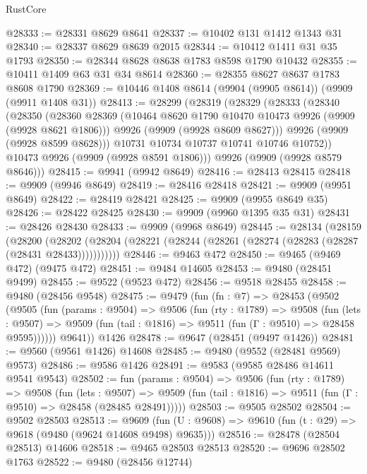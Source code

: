 \begin{lexlean}{RustCore}
\begin{coremodule}
@28333 := @28331 @8629 @8641
@28337 := @10402 @131 @1412 @1343 @31
@28340 := @28337 @8629 @8639 @2015
@28344 := @10412 @1411 @31 @35 @1793
@28350 := @28344 @8628 @8638 @1783 @8598 @1790 @10432
@28355 := @10411 @1409 @63 @31 @34 @8614
@28360 := @28355 @8627 @8637 @1783 @8608 @1790
@28369 := @10446 @1408 @8614 (@9904 (@9905 @8614)) (@9909 (@9911 @1408 @31))
@28413 := @28299
    (@28319
      (@28329
        (@28333
          (@28340
            (@28350
              (@28360
                @28369
                (@10464 @8620 @1790 @10470 @10473 @9926 (@9909 (@9928 @8621 @1806)))
                @9926
                (@9909 (@9928 @8609 @8627)))
              @9926
              (@9909 (@9928 @8599 @8628)))
            @10731
            @10734
            @10737
            @10741
            @10746
            @10752))
        @10473
        @9926
        (@9909 (@9928 @8591 @1806)))
      @9926
      (@9909 (@9928 @8579 @8646)))
@28415 := @9941 (@9942 @8649)
@28416 := @28413 @28415
@28418 := @9909 (@9946 @8649)
@28419 := @28416 @28418
@28421 := @9909 (@9951 @8649)
@28422 := @28419 @28421
@28425 := @9909 (@9955 @8649 @35)
@28426 := @28422 @28425
@28430 := @9909 (@9960 @1395 @35 @31)
@28431 := @28426 @28430
@28433 := @9909 (@9968 @8649)
@28445 := @28134
    (@28159
      (@28200
        (@28202 (@28204 (@28221 (@28244 (@28261 (@28274 (@28283 (@28287 (@28431 @28433)))))))))))
@28446 := @9463 @472
@28450 := @9465 (@9469 @472) (@9475 @472)
@28451 := @9484 @14605
@28453 := @9480 (@28451 @9499)
@28455 := @9522 (@9523 @472)
@28456 := @9518 @28455
@28458 := @9480 (@28456 @9548)
@28475 := @9479
    (fun (fn : @7) =>
    @28453
      (@9502
        (@9505
          (fun (params : @9504) =>
          @9506
            (fun (rty : @1789) =>
            @9508
              (fun (lets : @9507) =>
              @9509 (fun (tail : @1816) => @9511 (fun (Γ : @9510) => @28458 @9595))))))
        @9641))
    @1426
@28478 := @9647 (@28451 (@9497 @1426))
@28481 := @9560 (@9561 @1426) @14608
@28485 := @9480 (@9552 (@28481 @9569) @9573)
@28486 := @9586 @1426
@28491 := @9583 (@9585 @28486 @14611 @9541 @9543)
@28502 := fun (params : @9504) =>
  @9506
    (fun (rty : @1789) =>
    @9508
      (fun (lets : @9507) =>
      @9509 (fun (tail : @1816) => @9511 (fun (Γ : @9510) => @28458 (@28485 @28491)))))
@28503 := @9505 @28502
@28504 := @9502 @28503
@28513 := @9609
    (fun (U : @9608) => @9610 (fun (t : @29) => @9618 (@9480 (@9624 @14608 @9498) @9635)))
@28516 := @28478 (@28504 @28513) @14606
@28518 := @9465 @28503 @28513
@28520 := @9696 @28502 @1763
@28522 := @9480 (@28456 @12744)

\end{coremodule}
\end{lexlean}
